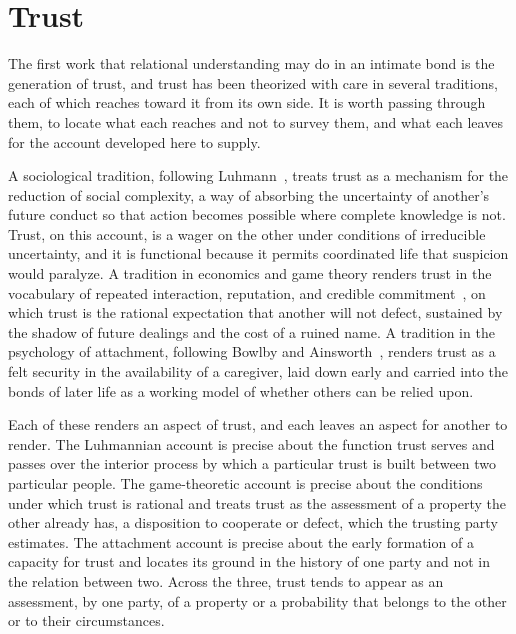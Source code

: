 \section{Trust}
\label{p27:sec:trust}

\noindent
The first work that relational understanding may do in an intimate bond is the generation of trust, and trust has been theorized with care in several traditions, each of which reaches toward it from its own side. It is worth passing through them, to locate what each reaches and not to survey them, and what each leaves for the account developed here to supply.

A sociological tradition, following Luhmann~\parencite{luhmann1979trust}, treats trust as a mechanism for the reduction of social complexity, a way of absorbing the uncertainty of another's future conduct so that action becomes possible where complete knowledge is not. Trust, on this account, is a wager on the other under conditions of irreducible uncertainty, and it is functional because it permits coordinated life that suspicion would paralyze. A tradition in economics and game theory renders trust in the vocabulary of repeated interaction, reputation, and credible commitment~\parencite{axelrod1984cooperation}, on which trust is the rational expectation that another will not defect, sustained by the shadow of future dealings and the cost of a ruined name. A tradition in the psychology of attachment, following Bowlby and Ainsworth~\parencite{bowlby1969attachment,ainsworth1978patterns}, renders trust as a felt security in the availability of a caregiver, laid down early and carried into the bonds of later life as a working model of whether others can be relied upon.

Each of these renders an aspect of trust, and each leaves an aspect for another to render. The Luhmannian account is precise about the function trust serves and passes over the interior process by which a particular trust is built between two particular people. The game-theoretic account is precise about the conditions under which trust is rational and treats trust as the assessment of a property the other already has, a disposition to cooperate or defect, which the trusting party estimates. The attachment account is precise about the early formation of a capacity for trust and locates its ground in the history of one party and not in the relation between two. Across the three, trust tends to appear as an assessment, by one party, of a property or a probability that belongs to the other or to their circumstances.

